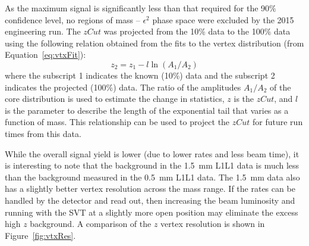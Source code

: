 As the maximum signal is significantly less than that required for the 90$\%$ confidence level, no regions of mass -- $\epsilon^2$ phase space were excluded by the 2015 engineering run. The $zCut$ was projected from the 10$\%$ data to the 100$\%$ data using the following relation obtained from the fits to the vertex distribution (from Equation~\eqref{eq:vtxFit}):
\begin{equation}
\label{eq:zProjected}
z_{2} = z_{1} - l\ln(A_1/A_2)
\end{equation}
where the subscript 1 indicates the known (10$\%$) data and the subscript 2 indicates the projected (100$\%$) data. The ratio of the amplitudes $A_1/A_2$ of the core distribution is used to estimate the change in statistics, $z$ is the $zCut$, and $l$ is the parameter to describe the length of the exponential tail that varies as a function of mass. This relationship can be used to project the $zCut$ for future run times from this data. 

%
%
While the overall signal yield is lower (due to lower rates and less beam time), it is interesting to note that the background in the 1.5~mm L1L1 data is much less than the background measured in the 0.5~mm L1L1 data. The 1.5~mm data also has a slightly better vertex resolution across the mass range. If the rates can be handled by the detector and read out, then increasing the beam luminosity and running with the SVT at a slightly more open position may eliminate the excess high $z$ background. A comparison of the $z$ vertex resolution is shown in Figure~\ref{fig:vtxRes}. 

